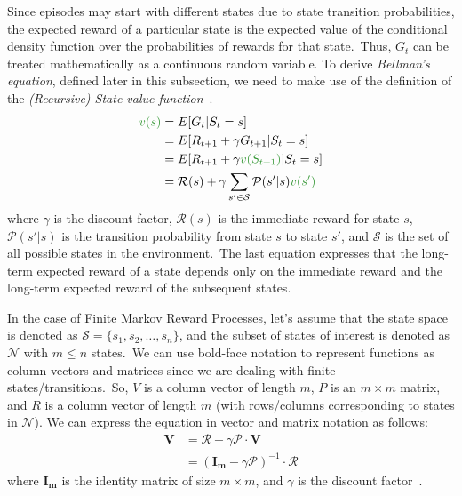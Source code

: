 \documentclass[../xlapes02]{subfiles}
\begin{document}
    Since episodes may start with different states due to state transition probabilities, the expected reward of a particular state is the expected value of the conditional density function over the probabilities of rewards for that state.\ Thus, $G_t$ can be treated mathematically as a continuous random variable.
    To derive \emph{Bellman's equation}, defined later in this subsection, we need to make use of the definition of the \emph{(Recursive) State-value function}~\cite{FITMT25127, rao2022foundations}.
    \begin{equation}
        \label{eq:state-value-function}
        \begin{split}
            \textcolor[RGB]{50,150,50}{v(s)}&=E[G_t|S_t=s]\\
            &=E[R_{t+1}+\gamma G_{t+1}|S_t=s]\\
            &=E[R_{t+1}+\gamma\textcolor[RGB]{50,150,50}{v(S_{t+1})}|S_t=s]\\
            &=\mathcal{R}(s)+\gamma\sum_{s'\in\mathcal{S}}\mathcal{P}(s'|s)\textcolor[RGB]{50,150,50}{v(s')}
        \end{split}
    \end{equation}
    where $\gamma$ is the discount factor, $\mathcal{R}(s)$ is the immediate reward for state $s$, $\mathcal{P}(s'|s)$ is the transition probability from state $s$ to state $s'$, and $\mathcal{S}$ is the set of all possible states in the environment.\ The last equation expresses that the long-term expected reward of a state depends only on the immediate reward and the long-term expected reward of the subsequent states.

    In the case of Finite Markov Reward Processes, let's assume that the state space is denoted as $\mathcal{S} = \{s_1, s_2, \dots, s_n\}$, and the subset of states of interest is denoted as $\mathcal{N}$ with $m \leq n$ states.\ We can use bold-face notation to represent functions as column vectors and matrices since we are dealing with finite states/transitions.\ So, $V$ is a column vector of length $m$, $P$ is an $m \times m$ matrix, and $R$ is a column vector of length $m$ (with rows/columns corresponding to states in $\mathcal{N}$). We can express the equation in vector and matrix notation as follows:
    \begin{equation}
        \label{eq:state-value-function-matrix}
        \begin{split}
            \bm{V}&=\bm{\mathcal{R}}+\gamma \bm{\mathcal{P}}\cdot \bm{V}\\
            &=(\bm{I_m}-\gamma \bm{\mathcal{P}})^{-1}\cdot \bm{\mathcal{R}}
        \end{split}
    \end{equation}
    where $\bm{I_m}$ is the identity matrix of size $m\times m$, and $\gamma$ is the discount factor~\cite{rao2022foundations}.
\end{document}

